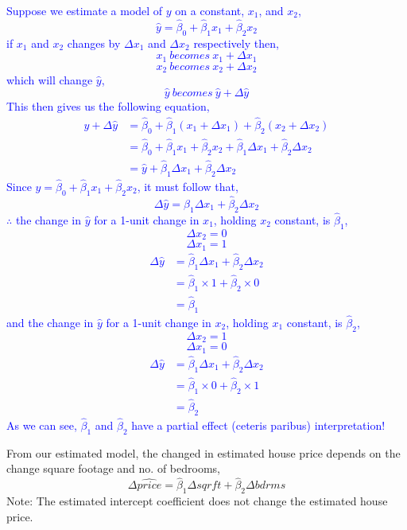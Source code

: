 \documentclass[12pt]{report}
\newenvironment{blueframed}[1][blue]
{\def\FrameCommand{\fboxsep=\FrameSep\fcolorbox{#1}{white}}%
	\MakeFramed {\advance\hsize-\width \FrameRestore}}
{\endMakeFramed}
\begin{document}
\begin{blueframed}
\noindent \textcolor{blue}
{
	\noindent Suppose we estimate a model of $y$ on a constant, $x_1$, and $x_2$,
	$$\hat{y} = \hat{\beta}_0 + \hat{\beta}_1x_1 + \hat{\beta}_2x_2$$
	if $x_1$ and $x_2$ changes by ${\Delta}x_1$ and ${\Delta}x_2$ respectively then,
	$$x_1\ becomes\ x_1 +{\Delta}x_1$$
	$$x_2\ becomes\ x_2 +{\Delta}x_2$$
	which will change $\hat{y}$,  
	$$\hat{y}\ becomes\ \hat{y}+{\Delta}\hat{y}$$
	This then gives us the following equation,
	\begin{align*}
		\hat{y}+{\Delta}\hat{y} &= \hat{\beta}_0 + \hat{\beta}_1(x_1 + {\Delta}x_1) + \hat{\beta}_2(x_2+{\Delta}x_2) \\
		&= \hat{\beta}_0 + \hat{\beta}_1x_1 + \hat{\beta}_2x_2 + \hat{\beta}_1{\Delta}x_1 + \hat{\beta}_2{\Delta}x_2 \\
		&= \hat{y} + \hat{\beta}_1{\Delta}x_1 + \hat{\beta}_2{\Delta}x_2 
	\end{align*}
	Since $\hat{y} = \hat{\beta}_0 + \hat{\beta}_1x_1 + \hat{\beta}_2x_2$, it must follow that,
	$${\Delta}\hat{y} = \hat{\beta}_1{\Delta}x_1 + \hat{\beta}_2{\Delta}x_2$$
	$\therefore$  the change in $\hat{y}$ for a 1-unit change in $x_1$, holding $x_2$ constant, is $\hat{\beta}_1$,
	$${\Delta}x_2 = 0$$
	$${\Delta}x_1 = 1$$
	\begin{align*}
		{\Delta}\hat{y} &= \hat{\beta}_1{\Delta}x_1 + \hat{\beta}_2{\Delta}x_2 \\
		&= \hat{\beta}_1\times 1 + \hat{\beta}_2\times 0 \\
		&= \hat{\beta}_1
	\end{align*}
	and the change in $\hat{y}$ for a 1-unit change in $x_2$, holding $x_1$ constant, is $\hat{\beta}_2$,
	$${\Delta}x_2 = 1$$
	$${\Delta}x_1 = 0$$
	\begin{align*}
	{\Delta}\hat{y} &= \hat{\beta}_1{\Delta}x_1 + \hat{\beta}_2{\Delta}x_2 \\
	&= \hat{\beta}_1\times 0 + \hat{\beta}_2\times 1 \\
	&= \hat{\beta}_2
	\end{align*}
	As we can see, $\hat{\beta}_1$ and $\hat{\beta}_2$ have a partial effect (ceteris paribus) interpretation!
}\end{blueframed}

\noindent From our estimated model, the changed in estimated house price depends on the change square footage and no. of bedrooms,
$$\Delta\widehat{price} = \hat{\beta}_1\Delta sqrft + \hat{\beta}_2\Delta bdrms$$
\noindent Note: The estimated intercept coefficient does not change the estimated house price.
\end{document}
